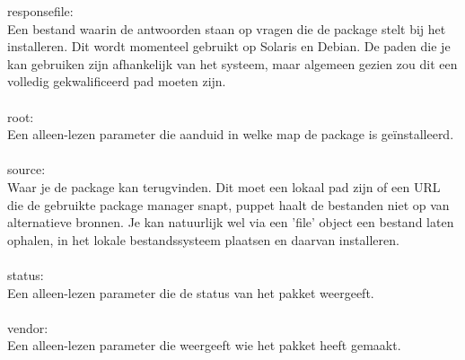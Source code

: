 %
responsefile:\\
Een bestand waarin de antwoorden staan op vragen die de package stelt bij het installeren. Dit wordt momenteel gebruikt op Solaris en Debian. De paden die je kan gebruiken zijn afhankelijk van het systeem, maar algemeen gezien zou dit een volledig gekwalificeerd pad moeten zijn.\\\\
%
root:\\
Een alleen-lezen parameter die aanduid in welke map de package is ge\"installeerd.\\\\
%
source:\\
Waar je de package kan terugvinden. Dit moet een lokaal pad zijn of een URL die de gebruikte package manager snapt, puppet haalt de bestanden niet op van alternatieve bronnen. Je kan natuurlijk wel via een 'file' object een bestand laten ophalen, in het lokale bestandssysteem plaatsen en daarvan installeren.\\\\
%
status:\\
Een alleen-lezen parameter die de status van het pakket weergeeft.\\\\
%
vendor:\\
Een alleen-lezen parameter die weergeeft wie het pakket heeft gemaakt.\\\\
